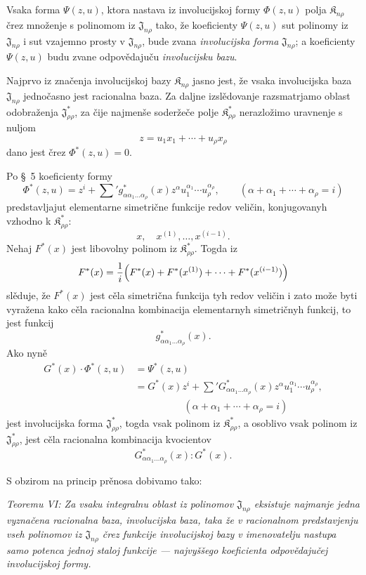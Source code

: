 \documentclass[11pt]{article}
\providecommand{\Kfield}{\mathfrak{K}}
\providecommand{\Jdom}{\mathfrak{J}}
\begin{document}
Vsaka forma $\Psi(z,u)$, ktora nastava iz involucijskoj formy $\Phi(z,u)$ polja $\Kfield_{n\rho}$ črez množenje s polinomom iz $\Jdom_{n\rho}$ tako, že koeficienty $\Psi(z,u)$ sut polinomy iz $\Jdom_{n\rho}$ i sut vzajemno prosty v $\Jdom_{n\rho}$, bude zvana {\itshape involucijska forma} $\Jdom_{n\rho}$; a koeficienty $\Psi(z,u)$ budu zvane odpovědajuču {\itshape involucijsku bazu}.

Najprvo iz značenja involucijskoj bazy $\Kfield_{n\rho}$ jasno jest, že vsaka involucijska baza $\Jdom_{n\rho}$ jednočasno jest racionalna baza. Za daljne izslědovanje razsmatrjamo oblast odobraženja $\Jdom^*_{\rho\rho}$, za čije najmenše soderžeče polje $\Kfield^*_{\rho\rho}$ nerazložimo uravnenje s nuljom
\[
  z=u_1x_1+\cdots+u_\rho x_\rho
\]
dano jest črez $\Phi^*(z,u)=0$.

Po \S\ 5 koeficienty formy
\[
  \Phi^*(z,u)=z^i+\sum{}' g^*_{\alpha\alpha_1\ldots\alpha_\rho}(x)
  z^\alpha u_1^{\alpha_1}\cdots u_\rho^{\alpha_\rho},
  \qquad
  (\alpha+\alpha_1+\cdots+\alpha_\rho=i)
\]
predstavljajut elementarne simetrične funkcije redov veličin, konjugovanyh vzhodno k $\Kfield^*_{\rho\rho}$:
\[
  x,\quad x^{(1)},\ldots,x^{(i-1)}.
\]
Nehaj $F^*(x)$ jest libovolny polinom iz $\Kfield^*_{\rho\rho}$. Togda iz
\[
  F^*(x)=\frac1i\Bigl(F^*(x)+F^*(x^{(1)})+
  \cdots+F^*(x^{(i-1)})\Bigr)
\]
slěduje, že $F^*(x)$ jest cěla simetrična funkcija tyh redov veličin i zato može byti vyražena kako cěla racionalna kombinacija elementarnyh simetričnyh funkcij, to jest funkcij
\[
  g^*_{\alpha\alpha_1\ldots\alpha_\rho}(x).
\]
Ako nyně
\[
\begin{aligned}
  G^*(x)\cdot\Phi^*(z,u)
  &=\Psi^*(z,u)\\
  &=G^*(x)z^i+
    \sum{}'G^*_{\alpha\alpha_1\ldots\alpha_\rho}(x)
    z^\alpha u_1^{\alpha_1}\cdots u_\rho^{\alpha_\rho},\\
  &\hspace{5em}(\alpha+\alpha_1+\cdots+\alpha_\rho=i)
\end{aligned}
\]
jest involucijska forma $\Jdom^*_{\rho\rho}$, togda vsak polinom iz $\Kfield^*_{\rho\rho}$, a osoblivo vsak polinom iz $\Jdom^*_{\rho\rho}$, jest cěla racionalna kombinacija kvocientov
\[
  G^*_{\alpha\alpha_1\ldots\alpha_\rho}(x):G^*(x).
\]

S obzirom na princip prěnosa dobivamo tako:

{\itshape Teoremu VI: Za vsaku integralnu oblast iz polinomov $\Jdom_{n\rho}$ eksistuje najmanje jedna vyznačena racionalna baza, involucijska baza, taka že v racionalnom predstavjenju vseh polinomov iz $\Jdom_{n\rho}$ črez funkcije involucijskoj bazy v imenovatelju nastupa samo potenca jednoj staloj funkcije --- najvyššego koeficienta odpovědajučej involucijskoj formy.}
\end{document}
